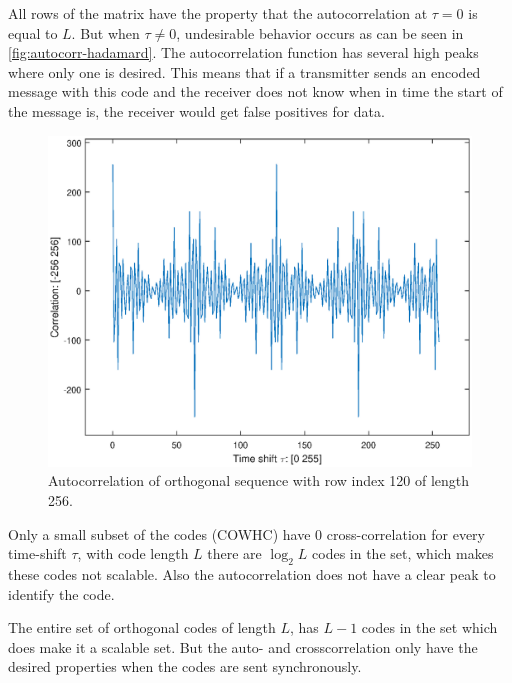 All rows of the matrix have the property that the autocorrelation at $\tau = 0$ is equal to $L$.
But when $\tau \neq 0$, undesirable behavior occurs as can be seen in \autoref{fig:autocorr-hadamard}.
The autocorrelation function has several high peaks where only one is desired.
This means that if a transmitter sends an encoded message with this code and the receiver does not know when in time the start of the message is, the receiver would get false positives for data.

\begin{figure}[t]
	\centering
	\includegraphics[width=\textwidth]{chapters/cdma-chapters/autocorr-hadamard.eps}
	\caption{Autocorrelation of orthogonal sequence with row index 120 of length 256.}
	\label{fig:autocorr-hadamard}
\end{figure}


Only a small subset of the codes (COWHC) have $0$ cross-correlation for every time-shift $\tau$, with code length $L$ there are $\log_2 L$ codes in the set, which makes these codes not scalable. Also the autocorrelation does not have a clear peak to identify the code.

The entire set of orthogonal codes of length $L$, has $L - 1$ codes in the set which does make it a scalable set.
But the auto- and crosscorrelation only have the desired properties when the codes are sent synchronously. 
